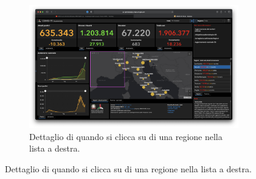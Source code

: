 \begin{enumerate}
\begin{figure}[H]
            \begin{subfigure}[b]{0.5\columnwidth}
                \includegraphics[width=\columnwidth]{../../../assets/images/verifica-risorse-esistenti/guidelines_violations_12.png}
                \caption{Dettaglio di quando si clicca su di una regione nella lista a destra.}
            \end{subfigure}


\end{figure}
\end{enumerate}
